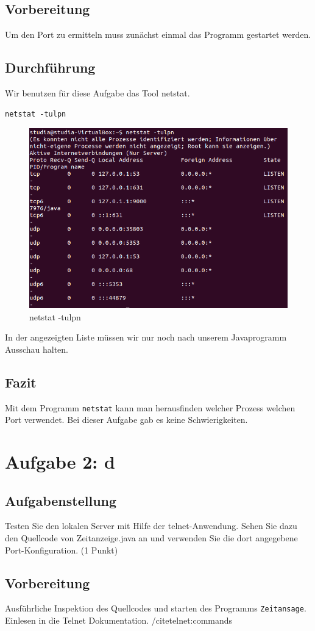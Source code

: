 \subsection{Vorbereitung}
Um den Port zu ermitteln muss zunächst einmal das Programm gestartet werden.

\subsection{Durchführung}
Wir benutzen für diese Aufgabe das Tool netstat.
\begin{lstlisting}
netstat -tulpn
\end{lstlisting}

\begin{figure}[H]
	\centering
	\includegraphics[width=0.4 \linewidth]{images/15}
	\caption{netstat -tulpn}
\end{figure}
In der angezeigten Liste müssen wir nur noch nach unserem Javaprogramm Ausschau halten.

\subsection{Fazit}
Mit dem Programm \texttt{netstat} kann man herausfinden welcher Prozess welchen Port verwendet. Bei dieser Aufgabe gab es keine Schwierigkeiten.

\section{Aufgabe 2: d}

\subsection{Aufgabenstellung}
Testen Sie den lokalen Server mit Hilfe der telnet-Anwendung. Sehen Sie dazu den Quellcode von Zeitanzeige.java an und verwenden Sie die dort angegebene Port-Konfiguration. (1 Punkt)

\subsection{Vorbereitung}
Ausführliche Inspektion des Quellcodes und starten des Programms \texttt{Zeitansage}.
Einlesen in die Telnet Dokumentation. /cite{telnet:commands }

